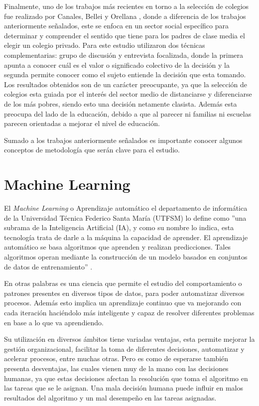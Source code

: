 Finalmente, uno de los trabajos más recientes en torno a la selección de colegios fue realizado por Canales, Bellei y Orellana \cite{canalesque}, donde a diferencia de los trabajos anteriormente señalados, este se enfoca en un sector social específico para determinar y comprender el sentido que tiene para los padres de clase media el elegir un colegio privado. Para este estudio utilizaron dos técnicas complementarias: grupo de discusión y entrevista focalizada, donde la primera apunta a conocer cuál es el valor o significado colectivo de la decisión y la segunda permite conocer como el sujeto entiende la decisión que esta tomando. Los resultados obtenidos son de un carácter preocupante, ya que la selección de colegios esta guiada por el interés del sector medio de distanciarse y diferenciarse de los más pobres, siendo esto una decisión netamente clasista. Además esta preocupa del lado de la educación, debido a que al parecer ni familias ni escuelas parecen orientadas a mejorar el nivel de educación.

Sumado a los trabajos anteriormente señalados es importante conocer algunos conceptos de metodología que serán clave para el estudio.

\section{Machine Learning}

El \textit{Machine Learning} o Aprendizaje automático el departamento de informática de la Universidad Técnica Federico Santa María (UTFSM) lo define como ''una subrama de la Inteligencia Artificial (IA), y como su nombre lo indica, esta tecnología trata de darle a la máquina la capacidad de aprender. El aprendizaje automático se basa algoritmos que aprenden y realizan predicciones. Tales algoritmos operan mediante la construcción de un modelo basados en conjuntos de datos de entrenamiento'' \cite{machinelearningUTFSM}.

En otras palabras es una ciencia que permite el estudio del comportamiento o patrones presentes en diversos tipos de datos, para poder automatizar diversos procesos. Además esto implica un aprendizaje continuo que va mejorando con cada iteración haciéndolo más inteligente y capaz de resolver diferentes problemas en base a lo que va aprendiendo.

Su utilización en diversos ámbitos tiene variadas ventajas, esta permite mejorar la gestión organizacional, facilitar la toma de diferentes decisiones, automatizar y acelerar procesos, entre muchas otras. Pero es como de esperarse también presenta desventajas, las cuales vienen muy de la mano con las decisiones humanas, ya que estas decisiones afectan la resolución que toma el algoritmo en las tareas que se le asignan. Una mala decisión humana puede influir en malos resultados del algoritmo y un mal desempeño en las tareas asignadas.

